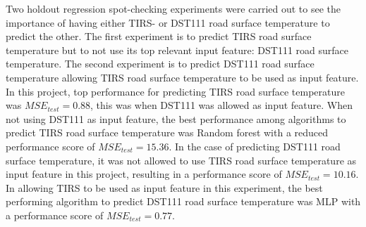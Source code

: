 	Two holdout regression spot-checking experiments were carried out to see the importance of having either TIRS- or DST111 road surface temperature to predict the other. The first experiment is to predict TIRS road surface temperature but to not use its top relevant input feature: DST111 road surface temperature. The second experiment is to predict DST111 road surface temperature allowing TIRS road surface temperature to be used as input feature. In this project, top performance for predicting TIRS road surface temperature was $MSE_{test} = 0.88$, this was when DST111 was allowed as input feature. When not using DST111 as input feature, the best performance among algorithms to predict TIRS road surface temperature was Random forest with a reduced performance score of $MSE_{test}=15.36$. In the case of predicting DST111 road surface temperature, it was not allowed to use TIRS road surface temperature as input feature in this project, resulting in a performance score of $MSE_{test}=10.16$. In allowing TIRS to be used as input feature in this experiment, the best performing algorithm to predict DST111 road surface temperature was MLP with a performance score of $MSE_{test}=0.77$. 

